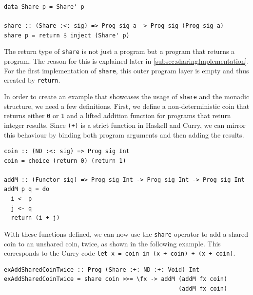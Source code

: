 \documentclass[a4paper, 11pt, fleqn, twoside, abstract=on]{scrreprt}
\newcommand{\hinl}[1]{\texttt{#1}}
\begin{document}
\begin{verbatim}
data Share p = Share' p

share :: (Share :<: sig) => Prog sig a -> Prog sig (Prog sig a)
share p = return $ inject (Share' p)
\end{verbatim}

The return type of \hinl{share} is not just a program but a program that returns a program.
The reason for this is explained later in \autoref{subsec:sharingImplementation}.
For the first implementation of \hinl{share}, this outer program layer is empty and thus created by \hinl{return}.

In order to create an example that showcases the usage of \hinl{share} and the monadic structure, we need a few definitions.
First, we define a non-deterministic coin that returns either \hinl{0} or \hinl{1} and a lifted addition function for programs that return integer results.
Since \hinl{(+)} is a strict function in Haskell and Curry, we can mirror this behaviour by binding both program arguments and then adding the results.

\begin{verbatim}
coin :: (ND :<: sig) => Prog sig Int
coin = choice (return 0) (return 1)

addM :: (Functor sig) => Prog sig Int -> Prog sig Int -> Prog sig Int
addM p q = do
  i <- p 
  j <- q 
  return (i + j)
\end{verbatim}

With these functions defined, we can now use the \hinl{share} operator to add a shared coin to an unshared coin, twice, as shown in the following example.
This corresponds to the Curry code \hinl{let x = coin in (x + coin) + (x + coin)}.

\begin{verbatim}
exAddSharedCoinTwice :: Prog (Share :+: ND :+: Void) Int
exAddSharedCoinTwice = share coin >>= \fx -> addM (addM fx coin) 
                                                  (addM fx coin)
\end{verbatim}

\vspace{0.32cm}
\end{document}
